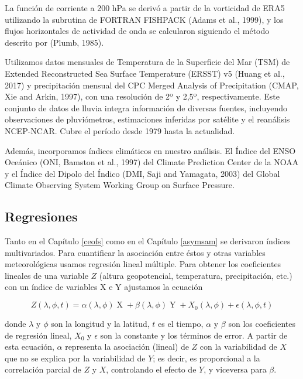 \documentclass[12pt,oneside]{reedthesis}
\begin{document}
La función de corriente a 200 hPa se derivó a partir de la vorticidad de ERA5 utilizando la subrutina de FORTRAN FISHPACK (Adams et al., 1999), y los flujos horizontales de actividad de onda se calcularon siguiendo el método descrito por (Plumb, 1985).

Utilizamos datos mensuales de Temperatura de la Superficie del Mar (TSM) de Extended Reconstructed Sea Surface Temperature (ERSST) v5 (Huang et al., 2017) y precipitación mensual del CPC Merged Analysis of Precipitation (CMAP, Xie and Arkin, 1997), con una resolución de 2º y 2,5º, respectivamente.
Este conjunto de datos de lluvia integra información de diversas fuentes, incluyendo observaciones de pluviómetros, estimaciones inferidas por satélite y el reanálisis NCEP-NCAR.
Cubre el período desde 1979 hasta la actualidad.

Además, incorporamos índices climáticos en nuestro análisis.
El Índice del ENSO Oceánico (ONI, Bamston et al., 1997) del Climate Prediction Center de la NOAA y el Índice del Dipolo del Índico (DMI, Saji and Yamagata, 2003) del Global Climate Observing System Working Group on Surface Pressure.

\hypertarget{regresiones}{%
\subsection{Regresiones}\label{regresiones}}

Tanto en el Capítulo \ref{ceofs} como en el Capítulo \ref{asymsam} se derivaron índices multivariados.
Para cuantificar la asociación entre éstos y otras variables meteorológicas usamos regresión lineal múltiple.
Para obtener los coeficientes lineales de una variable \(Z\) (altura geopotencial, temperatura, precipitación, etc.) con un índice de variables X e Y ajustamos la ecuación

\begin{equation}
Z(\lambda, \phi, t) = \alpha(\lambda, \phi) \operatorname{X} + \beta(\lambda, \phi) \operatorname{Y} + X_0(\lambda, \phi) + \epsilon(\lambda, \phi, t)
\label{eq:multiple-regression-sam}
\end{equation}

donde \(\lambda\) y \(\phi\) son la longitud y la latitud, \(t\) es el tiempo, \(\alpha\) y \(\beta\) son los coeficientes de regresión lineal, \(X_0\) y \(\epsilon\) son la constante y los términos de error.
A partir de esta ecuación, \(\alpha\) representa la asociación (lineal) de \(Z\) con la variabilidad de \(X\) que no se explica por la variabilidad de \(Y\); es decir, es proporcional a la correlación parcial de \(Z\) y \(X\), controlando el efecto de \(Y\), y viceversa para \(\beta\).
\end{document}
